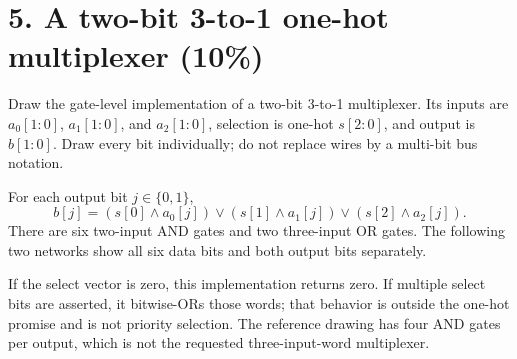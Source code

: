 \section{5. A two-bit 3-to-1 one-hot multiplexer (10\%)}
\begin{question}
Draw the gate-level implementation of a two-bit 3-to-1 multiplexer. Its inputs are $a_0[1:0]$, $a_1[1:0]$, and $a_2[1:0]$, selection is one-hot $s[2:0]$, and output is $b[1:0]$. Draw every bit individually; do not replace wires by a multi-bit bus notation.
\end{question}
\begin{solution}
For each output bit $j\in\{0,1\}$,
\[
b[j]=(s[0]\wedge a_0[j])\vee(s[1]\wedge a_1[j])\vee(s[2]\wedge a_2[j]).
\]
There are six two-input AND gates and two three-input OR gates. The following two networks show all six data bits and both output bits separately.
\begin{center}
\end{center}
If the select vector is zero, this implementation returns zero. If multiple select bits are asserted, it bitwise-ORs those words; that behavior is outside the one-hot promise and is not priority selection. The reference drawing has four AND gates per output, which is not the requested three-input-word multiplexer.
\end{solution}

